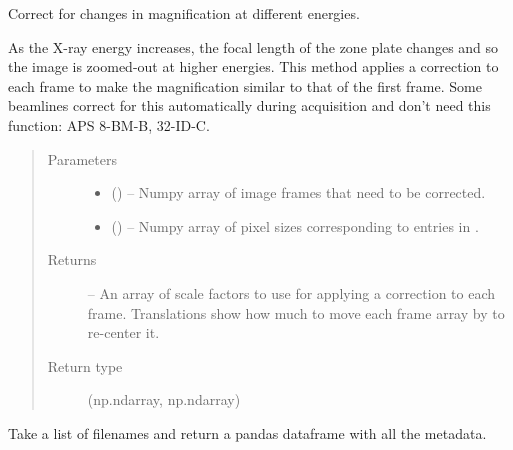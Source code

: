 \documentclass[letterpaper,10pt,english]{sphinxmanual}
\begin{document}
\begin{fulllineitems}
\label{\detokenize{xanespy:xanespy.importers.magnification_correction}}
Correct for changes in magnification at different energies.

As the X-ray energy increases, the focal length of the zone plate
changes and so the image is zoomed-out at higher energies. This
method applies a correction to each frame to make the
magnification similar to that of the first frame. Some beamlines
correct for this automatically during acquisition and don't need
this function: APS 8-BM-B, 32-ID-C.
\begin{quote}\begin{description}
\item[{Parameters}] \leavevmode\begin{itemize}
\item {} 
 () -- Numpy array of image frames that need to be corrected.

\item {} 
 () -- Numpy array of pixel sizes corresponding to entries in .

\end{itemize}

\item[{Returns}] \leavevmode
{} -- An array of scale factors to use for applying a correction to
each frame. Translations show how much to move each frame array by to re-center it.

\item[{Return type}] \leavevmode
(np.ndarray, np.ndarray)

\end{description}\end{quote}

\end{fulllineitems}


\begin{fulllineitems}
\label{\detokenize{xanespy:xanespy.importers.read_metadata}}
Take a list of filenames and return a pandas dataframe with all the
metadata.

\end{fulllineitems}
\end{document}
